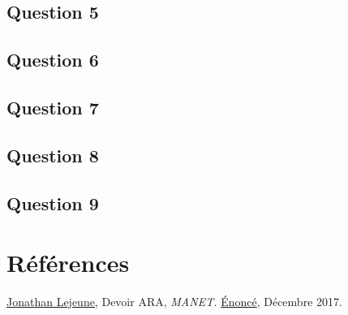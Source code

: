 \documentclass[10pt]{report}
\begin{document}
\subsection{Question 5}
\subsection{Question 6}
\subsection{Question 7}
\subsection{Question 8}
\subsection{Question 9}
\newpage
\section*{Références}
\href{https://pages.lip6.fr/Jonathan.Lejeune/}{Jonathan Lejeune}, Devoir ARA, \textit{MANET.} \href{https://pages.lip6.fr/Jonathan.Lejeune/documents/enseignements/ARA/sujet\_devoir\_2017\_2018.pdf}{Énoncé}, Décembre 2017.\\

\newpage
%
\end{document}
